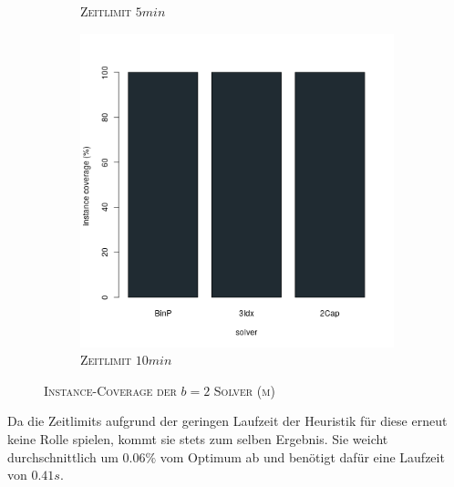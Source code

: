 \begin{figure}[H]
\begin{subfigure}[b]{0.3\textwidth}
\caption{\textsc{Zeitlimit} $5min$}
\label{fig:instance_cov_b=2_m_b}
\end{subfigure}
\hfill
\begin{subfigure}[b]{0.3\textwidth}
\centering
\includegraphics[width=1.2\textwidth]{img/solver_instance_coverage_b=2_m_600s.png}
\caption{\textsc{Zeitlimit} $10min$}
\label{fig:instance_cov_b=2_m_c}
\end{subfigure}
\caption{\textsc{Instance-Coverage der $b=2$ Solver (m)}}
\label{fig:instance_cov_b=2}
\end{figure}

Da die Zeitlimits aufgrund der geringen Laufzeit der Heuristik für diese erneut keine Rolle spielen,
kommt sie stets zum selben Ergebnis. Sie weicht durchschnittlich um $0.06 \%$ vom
Optimum ab und benötigt dafür eine Laufzeit von $0.41s$.

